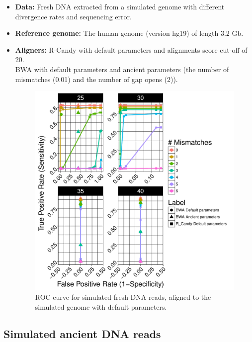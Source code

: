 \documentclass[11pt,a4paper]{report}
\begin{document}
 \begin{itemize}

   \item \textbf{Data:} Fresh DNA extracted from a simulated genome 
   with different divergence rates and sequencing error.
   
   \item \textbf{Reference genome:} The human genome (version hg19) of length 3.2 Gb.

    \item \textbf{Aligners:} 
R-Candy with default parameters and alignments score cut-off of 20. \\
BWA with default parameters and ancient parameters (the number of mismatches 
(0.01) and the number of gap opens (2)).


\begin{figure}[H]
\centering
\includegraphics[width=12cm]{pictures/bROC_DS6_emp_30.pdf}
\caption{ROC curve for simulated fresh DNA reads, aligned to the simulated genome
         with default parameters.}
\label{DS6_emp}
\end{figure}
  \end{itemize}




\subsection{Simulated ancient DNA reads}
\end{document}
